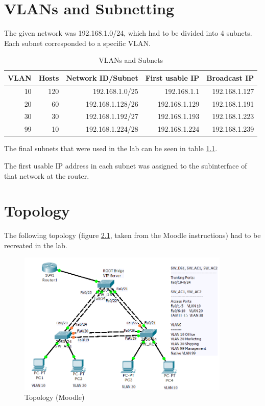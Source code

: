 \chapter{VLANs and Subnetting}

\thispagestyle{standard}
\pagestyle{standard}

The given network was 192.168.1.0/24, which had to be divided into 4 subnets. Each subnet corresponded to a specific \ac{VLAN}.

\begin{table}[h]
\centering
\begin{tabular}{r||r|r|r|r|}
\textbf{VLAN} & \textbf{Hosts} & \textbf{Network ID/Subnet} & \textbf{First usable IP} & \textbf{Broadcast IP} \\

		\hline
10 & 120 & 192.168.1.0/25 & 192.168.1.1 & 192.168.1.127  \\
20 & 60 & 192.168.1.128/26 & 192.168.1.129 & 192.168.1.191  \\
30 & 30 & 192.168.1.192/27 & 192.168.1.193 & 192.168.1.223  \\
99 & 10 & 192.168.1.224/28 & 192.168.1.224 & 192.168.1.239  \\

\end{tabular}
\caption{VLANs and Subnets}
\label{tab:vlan_subnets}
\end{table}

The final subnets that were used in the lab can be seen in table  \ref{tab:vlan_subnets}.

The first usable IP address in each subnet was assigned to the subinterface of that network at the router.

\chapter{Topology}

The following topology (figure \ref{img:topo}, taken from the Moodle instructions) had to be recreated in the lab.

\begin{figure}[H]
	\centering
	\includegraphics[width=0.9\textwidth]{img/topo.png}
	\caption{Topology (Moodle)}
	\label{img:topo}
\end{figure}

